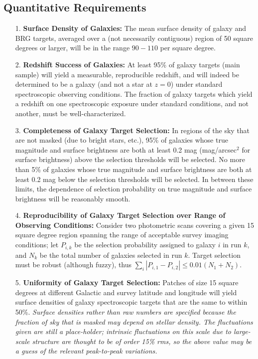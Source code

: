 \subsection{Quantitative Requirements}
\begin{enumerate}
\centerline{\bf Galaxies:}
\item[1.] {\bf Surface Density of Galaxies:} The mean surface density
of galaxy and BRG targets, averaged over a (not necessarily
contiguous) region of 50 square degrees or larger, will be in the
range $90-110$ per square degree.  
\item[2.] {\bf Redshift Success of Galaxies:} At least 95\% of galaxy
targets (main sample) will yield a measurable, reproducible redshift,
and will indeed be determined to be a galaxy (and not a star at $z =
0$) under standard spectroscopic observing conditions.  The fraction
of galaxy targets which yield a redshift on one spectroscopic exposure under
standard conditions, and not another, must be well-characterized. 
\item[3.] {\bf Completeness of Galaxy Target Selection:} In regions of
the sky that are not masked (due to bright stars, etc.), 
95\% of galaxies whose true magnitude and surface brightness are both at
least 0.2 mag (mag/arcsec$^2$ for surface brightness) above the selection
thresholds will be selected.  
No more than 5\% of galaxies whose true magnitude and surface brightness 
are both at least 0.2 mag below the selection thresholds will be selected.
In between these limits, the dependence of selection probability on
true magnitude and surface brightness will be reasonably
smooth. 
\item[4.] {\bf Reproducibility of Galaxy Target Selection over Range
of Observing Conditions:} 
Consider two photometric scans covering a given
15 square degree region spanning
the range of acceptable survey imaging conditions; let $P_{i,k}$ be
the selection probability assigned to galaxy $i$ in run $k$, and $N_k$
be the total number of galaxies selected in run $k$.  Target 
selection must be robust (although fuzzy), thus $\sum_i|P_{i,1} -
P_{i,2}| \le 0.01(N_1 + N_2)$. 
\item[5.] {\bf Uniformity of Galaxy Target Selection:} Patches of size
15 square degrees at different Galactic and survey latitude and
longitude will yield surface densities of galaxy spectroscopic targets
that are the same to within 50\%.  {\it Surface densities rather than
raw numbers are specified because the fraction of sky that is masked
may depend on stellar density.  The fluctuations given are still a
place-holder; intrinsic fluctuations on this scale due to large-scale
structure are thought to be of order 15\% rms, so the above value may
be a guess of the relevant peak-to-peak variations.}


\end{enumerate}
